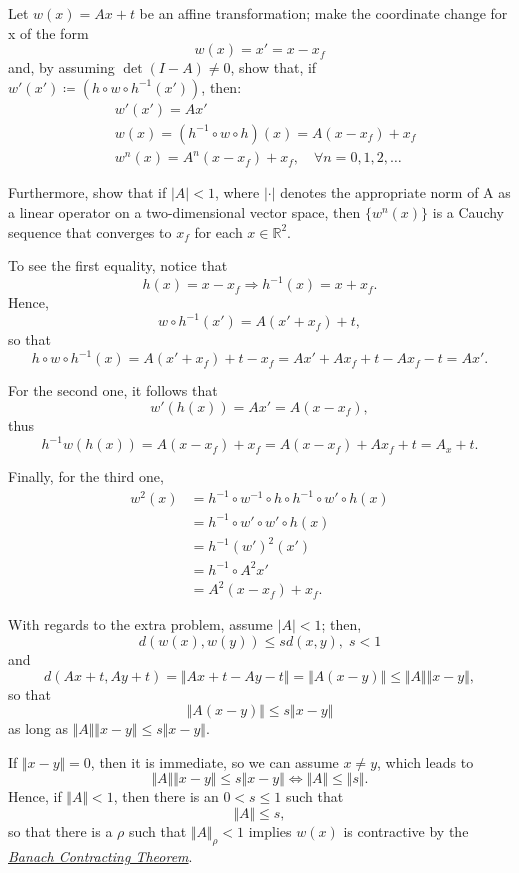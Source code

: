 \documentclass[../fractals_everywhere.tex]{subfiles}
\begin{document}
\begin{example}
	Let \(w(x) = Ax + t\) be an affine transformation; make the coordinate change for x of the form
	\[
		w(x) = x' = x - x_{f}
	\]
	and, by assuming \(\det{(I-A)}\neq 0\), show that, if \(w'(x')\coloneqq (h\circ w\circ h^{-1}(x'))\), then:
	\begin{align*}
		 & w'(x') = Ax'                                                     \\
		 & w(x) = (h^{-1}\circ w\circ h)(x) = A(x-x_{f}) + x_{f}            \\
		 & w^{n}(x) = A^{n}(x-x_{f})+x_{f}, \quad \forall n=0, 1, 2, \dotsc
	\end{align*}

	Furthermore, show that if \(| A |<1\), where \(| \cdot  |\) denotes the appropriate norm of A as a linear operator on a two-dimensional vector space, then \(\{w^{n}(x)\}\) is a Cauchy sequence that converges to \(x_{f}\) for each \(x\in \mathbb{R}^{2}\).

	To see the first equality, notice that
	\[
		h(x) = x-x_{f} \Rightarrow h^{-1}(x) = x+x_{f}.
	\]
	Hence,
	\[
		w\circ h^{-1}(x') = A(x'+x_{f})+t,
	\]
	so that
	\[
		h\circ w\circ h^{-1}(x) = A(x'+x_f)+t-x_f = Ax'+ Ax_{f}+t-Ax_{f}-t = Ax'.
	\]

	For the second one, it follows that
	\[
		w'(h(x)) = Ax'= A(x-x_{f}),
	\]
	thus
	\[
		h^{-1}w(h(x)) = A(x-x_{f}) + x_{f} = A(x-x_{f}) + Ax_{f}+t = A_{x}+t.
	\]

	Finally, for the third one,
	\begin{align*}
		w^{2}(x) & = h^{-1}\circ w^{-1}\circ h \circ h^{-1}\circ w'\circ h(x) \\
		         & = h^{-1}\circ w'\circ w'\circ h(x)                         \\
		         & = h^{-1}(w')^{2}(x')                                       \\
		         & = h^{-1}\circ A^{2}x'                                      \\
		         & =A^{2}(x-x_{f}) + x_{f}.
	\end{align*}

	With regards to the extra problem, assume \(| A |<1\); then,
	\[
		d(w(x), w(y))\leq sd(x, y),\; s < 1
	\]
	and
	\[
		d(Ax+t, Ay + t) =  \Vert Ax+t - Ay-t \Vert = \Vert A(x-y) \Vert \leq \Vert A \Vert\Vert x-y \Vert,
	\]
	so that
	\[
		\Vert A(x-y) \Vert\leq s \Vert x-y \Vert
	\]
	as long as \(\Vert A \Vert \Vert x-y \Vert\leq s \Vert x-y \Vert\).

	If \( \Vert x-y \Vert =0\), then it is immediate, so we can assume \(x\neq y\), which leads to
	\[
		\Vert A \Vert \Vert x-y \Vert \leq s \Vert x-y \Vert \Longleftrightarrow \Vert A \Vert \leq \Vert s \Vert.
	\]
	Hence, if \(\Vert A \Vert < 1\), then there is an \(0 < s\leq 1\) such that
	\[
		\Vert A \Vert \leq s,
	\]
	so that there is a \(\rho \) such that \(\Vert A \Vert_{\rho } < 1\) implies \(w(x)\) is contractive by the \hyperlink{contracting_map}{\textit{Banach Contracting Theorem}}.
\end{example}
\end{document}

